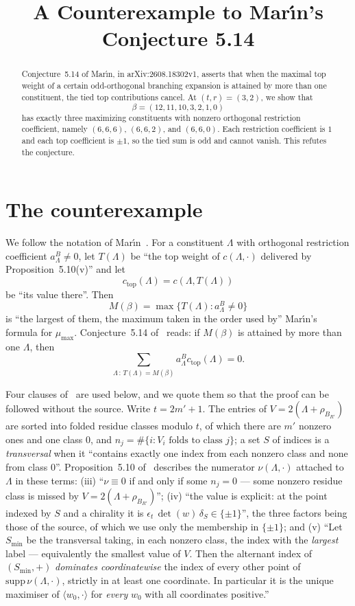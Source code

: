 \documentclass[11pt]{amsart}
\title[Counterexample to Mar\'\i n's Conjecture 5.14]
{A Counterexample to Mar\'\i n's Conjecture 5.14}
\date{}
\theoremstyle{remark}
\newcommand{\ctop}{c_{\mathrm{top}}}
\begin{document}
\begin{abstract}
Conjecture~5.14 of Mar\'\i n, in arXiv:2608.18302v1, asserts that when
the maximal top weight of a certain odd-orthogonal branching expansion is
attained by more than one constituent, the tied top contributions cancel.
At $(t,r)=(3,2)$, we show that
\[
\beta=(12,11,10,3,2,1,0)
\]
has exactly three maximizing constituents with nonzero orthogonal
restriction coefficient, namely $(6,6,6)$, $(6,6,2)$, and $(6,6,0)$.
Each restriction coefficient is $1$ and each top coefficient is
$\pm1$, so the tied sum is odd and cannot vanish. This refutes the
conjecture.
\end{abstract}

\maketitle

\section{The counterexample}

We follow the notation of Mar\'\i n~\cite{Marin}. For a constituent
$\Lambda$ with orthogonal restriction coefficient $a^B_\Lambda\ne0$, let
$T(\Lambda)$ be ``the top weight of $c(\Lambda,\cdot)$ delivered by
Proposition~5.10(v)'' and let
\[
\ctop(\Lambda)=c(\Lambda,T(\Lambda))
\]
be ``its value there''. Then
\[
M(\beta)=\max\{T(\Lambda):a^B_\Lambda\ne0\}
\]
is ``the largest of them, the maximum taken in the order used by''
Mar\'\i n's formula for $\mu_{\max}$. Conjecture~5.14 of~\cite{Marin} reads:
if $M(\beta)$ is attained by more than one $\Lambda$, then
\begin{equation}\label{eq:conjecture}
\sum_{\Lambda\,:\,T(\Lambda)=M(\beta)}
a^B_\Lambda\ctop(\Lambda)=0.
\end{equation}

Four clauses of~\cite{Marin} are used below, and we quote them so that the
proof can be followed without the source. Write $t=2m'+1$. The entries of
$V=2(\Lambda+\rho_{B_{R'}})$ are sorted into folded residue classes modulo
$t$, of which there are $m'$ nonzero ones and one class $0$, and
$n_j=\#\{i:V_i\text{ folds to class }j\}$; a set $S$ of indices is a
\emph{transversal} when it ``contains exactly one index from each nonzero
class and none from class $0$''. Proposition~5.10 of~\cite{Marin}
describes the numerator $\nu(\Lambda,\cdot)$ attached to $\Lambda$ in these
terms: (iii) ``$\nu\equiv0$ if and only if some $n_j=0$ --- some nonzero
residue class is missed by $V=2(\Lambda+\rho_{B_{R'}})$''; (iv) ``the value
is explicit: at the point indexed by $S$ and a chirality it is
$\epsilon_t\,\det(w)\,\delta_S\in\{\pm1\}$'', the three factors being those
of the source, of which we use only the membership in $\{\pm1\}$; and (v)
``Let $S_{\min}$ be the transversal taking, in each nonzero class, the
index with the \emph{largest} label --- equivalently the smallest value of
$V$. Then the alternant index of $(S_{\min},+)$ \emph{dominates
coordinatewise} the index of every other point of
$\mathrm{supp}\,\nu(\Lambda,\cdot)$, strictly in at least one coordinate.
In particular it is the unique maximiser of $\langle w_0,\cdot\rangle$ for
\emph{every} $w_0$ with all coordinates positive.''
\end{document}
